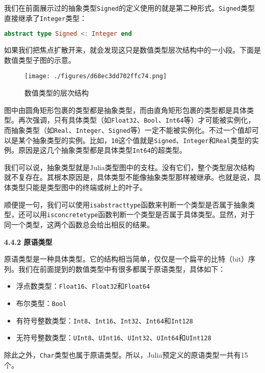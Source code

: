 我们在前面展示过的抽象类型\verb`Signed`的定义使用的就是第二种形式。\verb`Signed`类型直接继承了\verb`Integer`类型：

\begin{lstlisting}[language=julia]
abstract type Signed <: Integer end
\end{lstlisting}

如果我们把焦点扩散开来，就会发现这只是数值类型层次结构中的一小段。下面是数值类型子图的示意。

\begin{figure}[ht]
\centering
\texttt{[image: ./figures/d68ec3dd702ffc74.png]}
\caption{数值类型的层次结构} \label{fig_JuC4S4_1}
\end{figure}

图中由圆角矩形包裹的类型都是抽象类型，而由直角矩形包裹的类型都是具体类型。再次强调，只有具体类型（如\verb`Float32`、\verb`Bool`、\verb`Int64`等）才可能被实例化，而抽象类型（如\verb`Real`、\verb`Integer`、\verb`Signed`等）一定不能被实例化。不过一个值却可以是某个抽象类型的实例。比如，\verb`10`这个值就是\verb`Signed`、\verb`Integer`和\verb`Real`类型的实例。原因是这几个抽象类型都是具体类型\verb`Int64`的超类型。

我们可以说，抽象类型就是Julia类型图中的支柱。没有它们，整个类型层次结构就不复存在。其根本原因是，具体类型不能像抽象类型那样被继承。也就是说，具体类型只能是类型图中的终端或树上的叶子。

顺便提一句，我们可以使用\verb`isabstracttype`函数来判断一个类型是否属于抽象类型，还可以用\verb`isconcretetype`函数判断一个类型是否属于具体类型。显然，对于同一个类型，这两个函数总会给出相反的结果。

\textbf{4.4.2 原语类型}

原语类型是一种具体类型。它的结构相当简单，仅仅是一个扁平的比特（bit）序列。我们在前面提到的数值类型中有很多都属于原语类型，具体如下：

\begin{itemize}
\item 浮点数类型：\verb`Float16`、\verb`Float32`和\verb`Float64`
\item 布尔类型：\verb`Bool`
\item 有符号整数类型：\verb`Int8`、\verb`Int16`、\verb`Int32`、\verb`Int64`和\verb`Int128`
\item 无符号整数类型：\verb`UInt8`、\verb`UInt16`、\verb`UInt32`、\verb`UInt64`和\verb`UInt128`
\end{itemize}

除此之外，\verb`Char`类型也属于原语类型。所以，Julia预定义的原语类型一共有15个。

